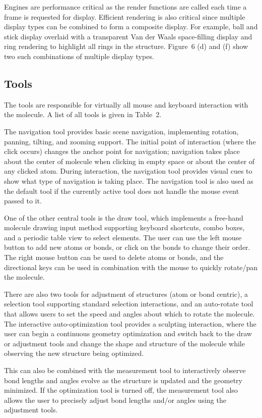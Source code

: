 \documentclass[10pt]{bmc_article}
\newenvironment{bmcformat}{\begin{raggedright}
  \baselineskip20pt\sloppy\setboolean{publ}{false}}{\end{raggedright}
  \baselineskip20pt\sloppy}
\begin{document}
\begin{bmcformat}
Engines are performance critical as the render functions are called each time a
frame is requested for display.  Efficient rendering is also critical
since multiple display types can be combined to form a composite display. For
example, ball and stick display overlaid with a transparent Van der Waals
space-filling display and ring rendering to highlight all rings in the
structure. Figure~6 (d) and (f) show two such combinations of
multiple display types.

\subsection*{Tools}

The tools are responsible for virtually all mouse and keyboard interaction with
the molecule. A list of all tools is given in Table~2.

The navigation tool provides basic scene navigation, implementing rotation,
panning, tilting, and zooming support. The initial point of interaction (where
the click occurs) changes the anchor point for navigation; navigation takes
place about the center of molecule when clicking in empty space or about the
center of any clicked atom. During interaction, the navigation tool provides
visual cues to show what type of navigation is taking place. The navigation
tool is also used as the default tool if the currently active tool does not
handle the mouse event passed to it.

One of the other central tools is the draw tool, which implements a free-hand
molecule drawing input method supporting keyboard shortcuts, combo boxes, and a
periodic table view to select elements. The user can use the left mouse button
to add new atoms or bonds, or click on the bonds to change their order. The
right mouse button can be used to delete atoms or bonds, and the directional keys
can be used in combination with the mouse to quickly rotate/pan the molecule.

There are also two tools for adjustment of structures (atom or bond centric), a
selection tool supporting standard selection interactions, and an auto-rotate
tool that allows users to set the speed and angles about which to rotate the
molecule. The interactive auto-optimization tool provides a sculpting
interaction, where the user can begin a continuous geometry optimization and
switch back to the draw or adjustment tools and change the shape and structure
of the molecule while observing the new structure being optimized.

This can also be combined with the measurement tool to interactively observe
bond lengths and angles evolve as the structure is updated and the geometry
minimized. If the optimization tool is turned off, the measurement tool also
allows the user to precisely adjust bond lengths and/or angles using the
adjustment tools.


\end{bmcformat}
\end{document}

